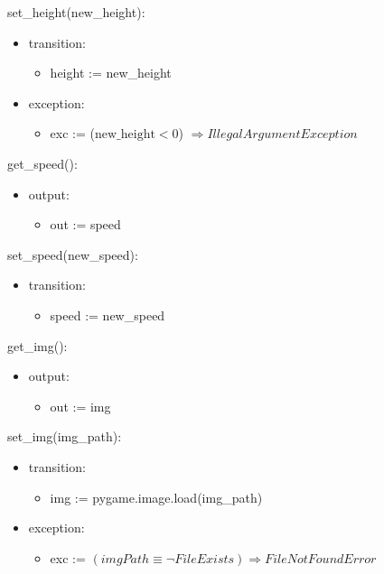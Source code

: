 \documentclass[12pt]{article}
\begin{document}
\noindent set\_height(new\_height):
\begin{itemize}
    \item transition: 
    \begin{itemize}[]
        \item height := new\_height
    \end{itemize}

    \item exception:
        \begin{itemize}[]
            \item exc := ($\text{new\_height} < 0$) $\Rightarrow  IllegalArgumentException$
        \end{itemize}
\end{itemize}


\noindent get\_speed():
\begin{itemize}
    \item output: 
    \begin{itemize}[]
        \item out := speed
    \end{itemize}
\end{itemize}


\noindent set\_speed(new\_speed):
\begin{itemize}
    \item transition: 
    \begin{itemize}[]
        \item speed := new\_speed
    \end{itemize}

\end{itemize}


\noindent get\_img():
\begin{itemize}
    \item output: 
    \begin{itemize}[]
        \item out := img 
    \end{itemize}
\end{itemize}


\noindent set\_img(img\_path):
\begin{itemize}
    \item transition: 
    \begin{itemize}[]
        \item img := pygame.image.load(img\_path)
    \end{itemize}
    \item exception: 
    \begin{itemize}[]
        \item exc := $(imgPath \equiv \neg FileExists) \Rightarrow FileNotFoundError $
    \end{itemize}
\end{itemize}
\end{document}
